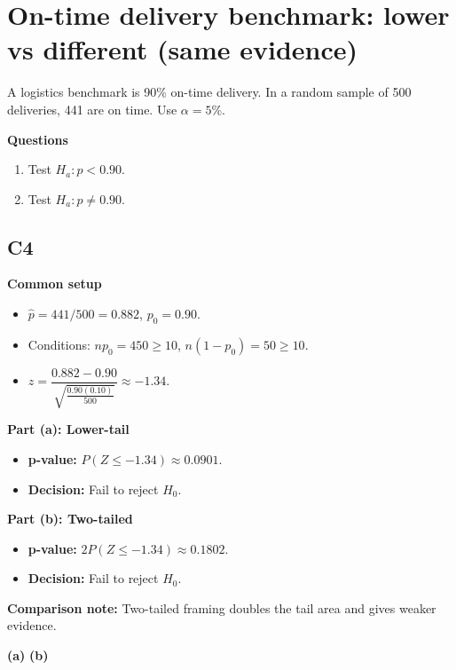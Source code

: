 \section{On-time delivery benchmark: lower vs different (same evidence)}
A logistics benchmark is 90\% on-time delivery. In a random sample of 500 deliveries, 441 are on time. Use \(\alpha=5\%\).

\textbf{Questions}
\begin{enumerate}
    \item[(a)] Test \(H_a\colon p<0.90\).
    \item[(b)] Test \(H_a\colon p\ne0.90\).
\end{enumerate}

\subsection*{C4}
\textbf{Common setup}
\begin{itemize}
    \item \(\hat p=441/500=0.882\), \(p_0=0.90\).
    \item Conditions: \(np_0=450\ge10\), \(n(1-p_0)=50\ge10\).
    \item \(z=\dfrac{0.882-0.90}{\sqrt{\frac{0.90(0.10)}{500}}}\approx -1.34\).
\end{itemize}

\textbf{Part (a): Lower-tail}
\begin{itemize}
    \item \textbf{p-value:} \(P(Z\le -1.34)\approx 0.0901\).
    \item \textbf{Decision:} Fail to reject \(H_0\).
\end{itemize}

\textbf{Part (b): Two-tailed}
\begin{itemize}
    \item \textbf{p-value:} \(2P(Z\le -1.34)\approx 0.1802\).
    \item \textbf{Decision:} Fail to reject \(H_0\).
\end{itemize}

\textbf{Comparison note:} Two-tailed framing doubles the tail area and gives weaker evidence.

\begin{center}
\textbf{(a)}\;
\hspace{0.8cm}
\textbf{(b)}\;
\end{center}


